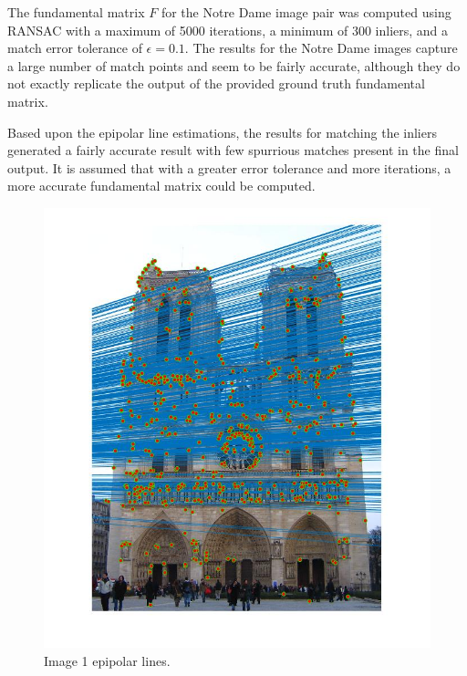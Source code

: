 \documentclass{article}
\begin{document}
		The fundamental matrix $F$ for the Notre Dame image pair was computed using RANSAC with a maximum of 5000 iterations, a minimum of 300 inliers, and a match error tolerance of $\epsilon = 0.1$. The results for the Notre Dame images capture a large number of match points and seem to be fairly accurate, although they do not exactly replicate the output of the provided ground truth fundamental matrix.

Based upon the epipolar line estimations, the results for matching the inliers generated a fairly accurate result with few spurrious matches present in the final output. It is assumed that with a greater error tolerance and more iterations, a more accurate fundamental matrix could be computed.



\begin{center}
\begin{figure}[H]
  \centering
  \begin{minipage}[b]{0.4\textwidth}
    \includegraphics[scale=0.25]{notre_dame_img1_epipolar_lines.jpg}
    \caption{Image 1 epipolar lines.}
  \end{minipage}
  \hfill
  \begin{minipage}[b]{0.4\textwidth}

\end{minipage}
\end{figure}
\end{center}
\end{document}
